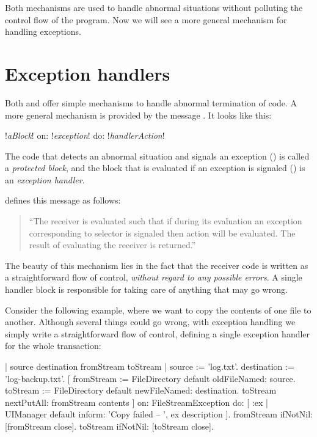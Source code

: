 \documentclass[a4paper,10pt,twoside]{book}
\begin{document}
Both mechanisms are used to handle abnormal situations without polluting the control flow of the program.
Now we will see a more general mechanism for handling exceptions.

\section{Exception handlers}

Both  and  offer simple mechanisms to handle abnormal termination of code. A more general mechanism is provided by the message . It looks like this:
\begin{code}{}
!\emph{aBlock}! on: !\emph{exception}! do: !\emph{handlerAction}!
\end{code}
\noindent
The code that detects an abnormal situation and signals an exception () is called a \emph{protected block}, and the block that is evaluated if an exception is signaled () is  an \emph{exception handler}.

 defines this message as follows:
\begin{quote}
``The receiver is evaluated such that if during its evaluation an exception corresponding to selector is signaled then action will be evaluated. The result of evaluating the receiver is returned.''
\end{quote}

The beauty of this mechanism lies in the fact that the receiver code is written as a straightforward flow of control, \emph{without regard to any possible errors}. A single handler block is responsible for taking care of anything that may go wrong.

Consider the following example, where we want to copy the contents of one file to another.
Although several things could go wrong, with exception handling we simply write a straightforward flow of control, defining a single exception handler for the whole transaction: 
\begin{code}{| source destination fromStream toStream |}
source := 'log.txt'.
destination := 'log-backup.txt'.
[	fromStream := FileDirectory default oldFileNamed: source.
	toStream := FileDirectory default newFileNamed: destination.
	toStream nextPutAll: fromStream contents
]
	on: FileStreamException
	do: [ :ex | UIManager default inform: 'Copy failed -- ', ex description ].
fromStream ifNotNil: [fromStream close].
toStream ifNotNil: [toStream close].
\end{code}
\end{document}
